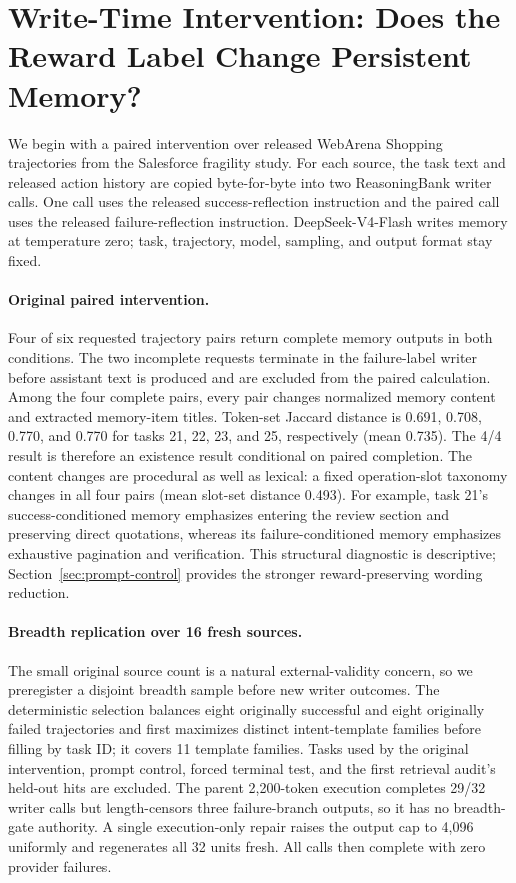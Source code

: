 \section{Write-Time Intervention: Does the Reward Label Change Persistent Memory?}
\label{sec:f0}
We begin with a paired intervention over released WebArena Shopping trajectories from the Salesforce fragility study. For each source, the task text and released action history are copied byte-for-byte into two ReasoningBank writer calls. One call uses the released success-reflection instruction and the paired call uses the released failure-reflection instruction. DeepSeek-V4-Flash writes memory at temperature zero; task, trajectory, model, sampling, and output format stay fixed.

\paragraph{Original paired intervention.}
Four of six requested trajectory pairs return complete memory outputs in both conditions. The two incomplete requests terminate in the failure-label writer before assistant text is produced and are excluded from the paired calculation. Among the four complete pairs, every pair changes normalized memory content and extracted memory-item titles. Token-set Jaccard distance is 0.691, 0.708, 0.770, and 0.770 for tasks 21, 22, 23, and 25, respectively (mean 0.735). The 4/4 result is therefore an existence result conditional on paired completion. The content changes are procedural as well as lexical: a fixed operation-slot taxonomy changes in all four pairs (mean slot-set distance 0.493). For example, task 21's success-conditioned memory emphasizes entering the review section and preserving direct quotations, whereas its failure-conditioned memory emphasizes exhaustive pagination and verification. This structural diagnostic is descriptive; Section~\ref{sec:prompt-control} provides the stronger reward-preserving wording reduction.

\paragraph{Breadth replication over 16 fresh sources.}
The small original source count is a natural external-validity concern, so we preregister a disjoint breadth sample before new writer outcomes. The deterministic selection balances eight originally successful and eight originally failed trajectories and first maximizes distinct intent-template families before filling by task ID; it covers 11 template families. Tasks used by the original intervention, prompt control, forced terminal test, and the first retrieval audit's held-out hits are excluded. The parent 2,200-token execution completes 29/32 writer calls but length-censors three failure-branch outputs, so it has no breadth-gate authority. A single execution-only repair raises the output cap to 4,096 uniformly and regenerates all 32 units fresh. All calls then complete with zero provider failures.

